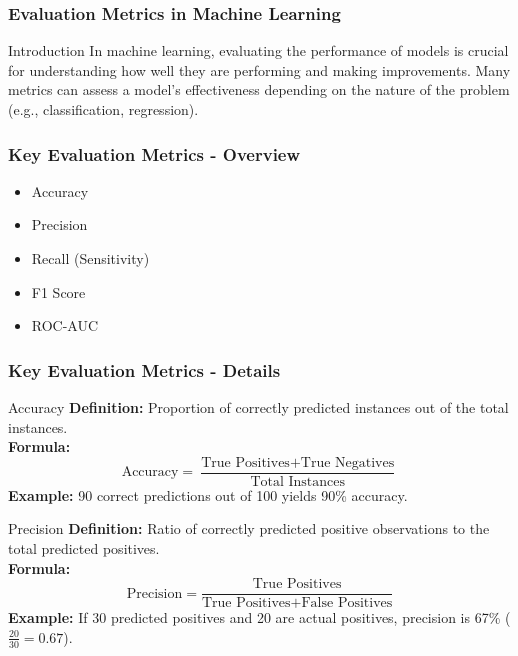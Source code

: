 \documentclass[aspectratio=169]{beamer}
\begin{document}
\begin{frame}[fragile]
    \frametitle{Evaluation Metrics in Machine Learning}
    \begin{block}{Introduction}
        In machine learning, evaluating the performance of models is crucial for understanding how well they are performing and making improvements. Many metrics can assess a model’s effectiveness depending on the nature of the problem (e.g., classification, regression).
    \end{block}
\end{frame}

\begin{frame}[fragile]
    \frametitle{Key Evaluation Metrics - Overview}
    \begin{itemize}
        \item Accuracy
        \item Precision
        \item Recall (Sensitivity)
        \item F1 Score
        \item ROC-AUC
    \end{itemize}
\end{frame}

\begin{frame}[fragile]
    \frametitle{Key Evaluation Metrics - Details}

    \begin{block}{Accuracy}
        \textbf{Definition:} Proportion of correctly predicted instances out of the total instances.\\
        \textbf{Formula:}
        \begin{equation}
        \text{Accuracy} = \frac{\text{True Positives} + \text{True Negatives}}{\text{Total Instances}}
        \end{equation}
        \textbf{Example:} 90 correct predictions out of 100 yields 90\% accuracy.
    \end{block}
    
    \begin{block}{Precision}
        \textbf{Definition:} Ratio of correctly predicted positive observations to the total predicted positives.\\
        \textbf{Formula:}
        \begin{equation}
        \text{Precision} = \frac{\text{True Positives}}{\text{True Positives} + \text{False Positives}}
        \end{equation}
        \textbf{Example:} If 30 predicted positives and 20 are actual positives, precision is 67\% (\(\frac{20}{30} = 0.67\)).
    \end{block}
\end{frame}
\end{document}
